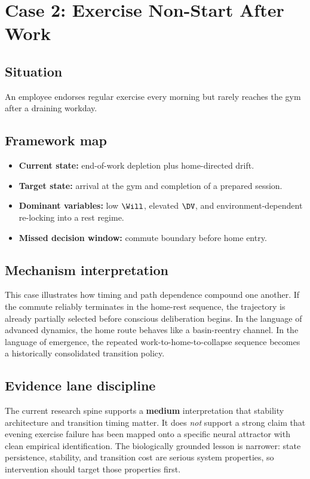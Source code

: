 \section{Case 2: Exercise Non-Start After Work}

\subsection*{Situation}
An employee endorses regular exercise every morning but rarely reaches the gym
after a draining workday.

\subsection*{Framework map}
\begin{itemize}[nosep]
  \item \textbf{Current state:} end-of-work depletion plus home-directed drift.
  \item \textbf{Target state:} arrival at the gym and completion of a prepared
        session.
  \item \textbf{Dominant variables:} low $\Will$, elevated $\DV$, and
        environment-dependent re-locking into a rest regime.
  \item \textbf{Missed decision window:} commute boundary before home entry.
\end{itemize}

\subsection*{Mechanism interpretation}
This case illustrates how timing and path dependence compound one another. If
the commute reliably terminates in the home-rest sequence, the trajectory is
already partially selected before conscious deliberation begins. In the
language of advanced dynamics, the home route behaves like a basin-reentry
channel. In the language of emergence, the repeated work-to-home-to-collapse
sequence becomes a historically consolidated transition policy.

\subsection*{Evidence lane discipline}
The current research spine supports a \textbf{medium} interpretation that
stability architecture and transition timing matter. It does \emph{not}
support a strong claim that evening exercise failure has been mapped onto a
specific neural attractor with clean empirical identification. The biologically
grounded lesson is narrower: state persistence, stability, and transition cost
are serious system properties, so intervention should target those properties
first.

